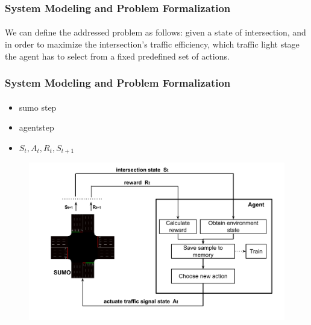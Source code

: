\documentclass[aspectratio=169]{beamer}
\begin{document}
\begin{frame}
\frametitle{System Modeling and Problem Formalization}
\framesubtitle{}
We can define the addressed problem as follows: given a state of intersection, and in order to maximize the intersection’s traffic
efficiency, which traffic light stage the agent has to select
from a fixed predefined set of actions.
\end{frame}
\begin{frame}
\frametitle{System Modeling and Problem Formalization}
\framesubtitle{}
\vspace{1cm}

\begin{minipage}{0.3\textwidth}
\begin{itemize}
    \item sumo step
    \item agentstep
    \item $S_{t}, A_{t}, R_{t}, S_{t+1}$
\end{itemize}
\end{minipage}%
\hfill
\begin{minipage}{0.7\textwidth}
\begin{figure}
    \centering
    \includegraphics[width=1\linewidth]{images/RL_TSC_Scheme.pdf}
\end{figure}
\end{minipage}
\end{frame}
\end{document}
